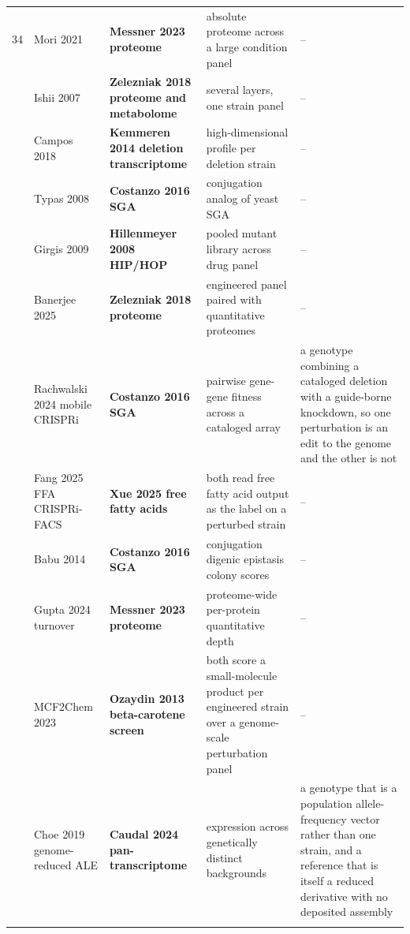 \begin{landscape}
\begin{longtable}{@{}r@{\hspace{4pt}} L{40mm} L{40mm} L{74mm} L{74mm}@{}}
34 & Mori 2021  & \textbf{Messner 2023 proteome} & absolute proteome across a large condition panel & -- \\
 & Ishii 2007  & \textbf{Zelezniak 2018 proteome and metabolome} & several layers, one strain panel & -- \\
 & Campos 2018  & \textbf{Kemmeren 2014 deletion transcriptome} & high-dimensional profile per deletion strain & -- \\
 & Typas 2008  & \textbf{Costanzo 2016 SGA} & conjugation analog of yeast SGA & -- \\
 & Girgis 2009  & \textbf{Hillenmeyer 2008 HIP/HOP} & pooled mutant library across drug panel & -- \\
 & Banerjee 2025  & \textbf{Zelezniak 2018 proteome} & engineered panel paired with quantitative proteomes & -- \\
 & Rachwalski 2024 mobile CRISPRi  & \textbf{Costanzo 2016 SGA} & pairwise gene-gene fitness across a cataloged array & a genotype combining a cataloged deletion with a guide-borne knockdown, so one perturbation is an edit to the genome and the other is not \\
 & Fang 2025 FFA CRISPRi-FACS  & \textbf{Xue 2025 free fatty acids} & both read free fatty acid output as the label on a perturbed strain & -- \\
 & Babu 2014  & \textbf{Costanzo 2016 SGA} & conjugation digenic epistasis colony scores & -- \\
 & Gupta 2024 turnover  & \textbf{Messner 2023 proteome} & proteome-wide per-protein quantitative depth & -- \\
 & MCF2Chem 2023  & \textbf{Ozaydin 2013 beta-carotene screen} & both score a small-molecule product per engineered strain over a genome-scale perturbation panel & -- \\
 & Choe 2019 genome-reduced ALE  & \textbf{Caudal 2024 pan-transcriptome} & expression across genetically distinct backgrounds & a genotype that is a population allele-frequency vector rather than one strain, and a reference that is itself a reduced derivative with no deposited assembly \\
\addlinespace[5pt]

\end{longtable}
\end{landscape}
